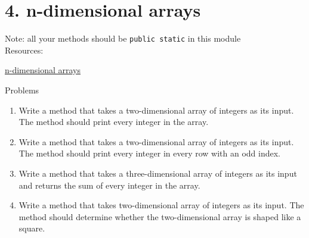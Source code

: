 \documentclass[12pt,letterpaper]{article}
\newcommand\hwnumber{4}
\begin{document}
\section*{\hwnumber. n-dimensional arrays}
Note: all your methods should be \lstinline{public static} in this module \\
Resources:
\begin{description}
    \item \href{https://www.programiz.com/java-programming/multidimensional-array}{n-dimensional arrays}
\end{description}


Problems
\begin{enumerate}
\item
Write a method that takes a two-dimensional array of integers as its input. The method should print every integer in the array.

\item
Write a method that takes a two-dimensional array of integers as its input. The method should print every integer in every row with an odd index.

\item
Write a method that takes a three-dimensional array of integers as its input and returns the sum of every integer in the array.

\item
Write a method that takes two-dimensional array of integers as its input. The method should determine whether the
two-dimensional array is shaped like a square.


\end{enumerate}
\end{document}

